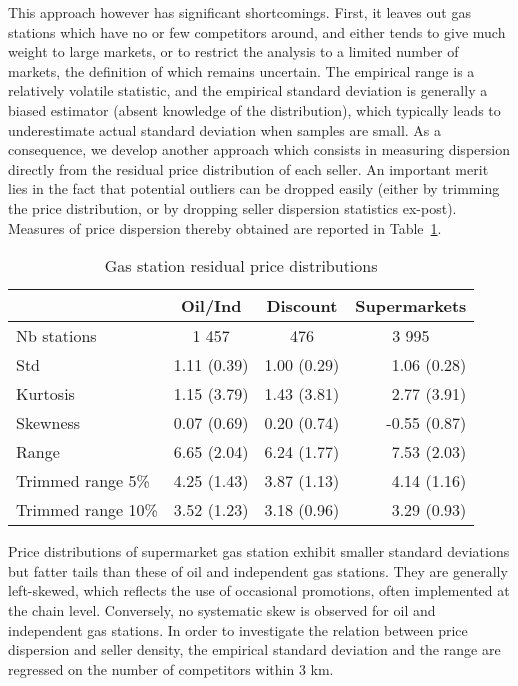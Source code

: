 \documentclass[english]{article}
\begin{document}
This approach however has significant shortcomings. First, it leaves out gas stations which have no or few competitors around, and either tends to give much weight to large markets, or to restrict the analysis to a limited number of markets, the definition of which remains uncertain. The empirical range is a relatively volatile statistic, and the empirical standard deviation is generally a biased estimator (absent knowledge of the distribution), which typically leads to underestimate actual standard deviation when samples are small. As a consequence, we develop another approach which consists in measuring dispersion directly from the residual price distribution of each seller. An important merit lies in the fact that potential outliers can be dropped easily (either by trimming the price distribution, or by dropping seller dispersion statistics ex-post). Measures of price dispersion thereby obtained are reported in Table~\ref{tab:station_price_support_stats_des}.

\begin{table}[H]
  \caption{Gas station residual price distributions}
	\label{tab:station_price_support_stats_des}
    \begin{tabular}{lrrr}
    \toprule
    \toprule
          & \multicolumn{1}{c}{Oil/Ind} & \multicolumn{1}{c}{Discount} & \multicolumn{1}{c}{Supermarkets} \\
    \midrule
    Nb stations & \multicolumn{1}{c}{1 457} & \multicolumn{1}{c}{476} & \multicolumn{1}{c}{3 995} \\
    Std   & 1.11 (0.39) & 1.00 (0.29) & 1.06 (0.28) \\
    Kurtosis & 1.15 (3.79) & 1.43 (3.81) & 2.77 (3.91) \\
    Skewness & 0.07 (0.69) & 0.20 (0.74) & -0.55 (0.87) \\
    Range & 6.65 (2.04) & 6.24 (1.77) & 7.53 (2.03) \\
    Trimmed range 5\% & 4.25 (1.43) & 3.87 (1.13) & 4.14 (1.16) \\
    Trimmed range 10\% & 3.52 (1.23) & 3.18 (0.96) & 3.29 (0.93) \\
    \bottomrule
    \bottomrule
\end{tabular}
\end{table}

Price distributions of supermarket gas station exhibit smaller standard deviations but fatter tails than these of oil and independent gas stations. They are generally left-skewed, which reflects the use of occasional promotions, often implemented at the chain level. Conversely, no systematic skew is observed for oil and independent gas stations. In order to investigate the relation between price dispersion and seller density, the empirical standard deviation and the range are regressed on the number of competitors within 3 km.
\end{document}
